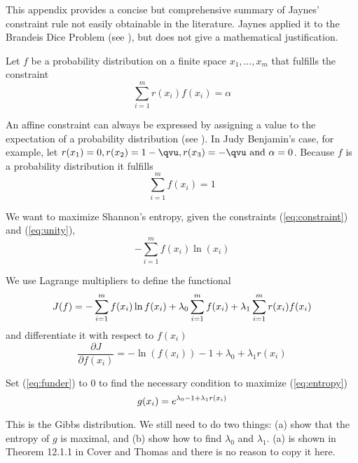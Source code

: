 This appendix provides a concise but comprehensive summary of
Jaynes' constraint rule not easily obtainable in the literature.
Jaynes applied it to the Brandeis Dice Problem (see
), but does not give a mathematical
justification.

Let $f$ be a probability distribution on a finite space
$x_{1},\ldots,x_{m}$ that fulfills the constraint 
\begin{equation}
  \label{eq:constraint}
\sum_{i=1}^{m}r(x_{i})f(x_{i})=\alpha
\end{equation}

An affine constraint can always be expressed by assigning a value to
the expectation of a probability distribution (see
). In Judy Benjamin's case, for example, let
$r(x_{1})=0, r(x_{2})=1-{\qvu}, r(x_{3})=-{\qvu}\mbox{ and }\alpha=0$. Because $f$
is a probability distribution it fulfills
\begin{equation}
  \label{eq:unity}
\sum_{i=1}^{m}f(x_{i})=1
\end{equation}

We want to maximize Shannon's entropy, given the constraints
({\ref{eq:constraint}}) and ({\ref{eq:unity}}),
\begin{equation}
  \label{eq:entropy}
-\sum_{i=1}^{m}f(x_{i})\ln(x_{i})
\end{equation}

We use Lagrange multipliers to define the functional
\begin{equation}
  \label{eq:functional}
J(f)=-\sum_{i=1}^{m}f(x_{i})\ln{}f(x_{i})+\lambda_{0}\sum_{i=1}^{m}f(x_{i})+\lambda_{1}\sum_{i=1}^{m}r(x_{i})f(x_{i})\notag
\end{equation}
and differentiate it with respect to $f(x_{i})$
\begin{equation}
  \label{eq:funder}
\frac{\partial{}J}{\partial{}f(x_{i})}=-\ln(f(x_{i}))-1+\lambda_{0}+\lambda_{1}r(x_{i})
\end{equation}

Set ({\ref{eq:funder}}) to $0$ to find the necessary condition to
maximize ({\ref{eq:entropy}})
\begin{equation}
  \label{eq:coverthomas}
g(x_{i})=e^{\lambda_{0}-1+\lambda_{1}r(x_{i})}\notag
\end{equation}

This is the Gibbs distribution. We still need to do two things: (a)
show that the entropy of $g$ is maximal, and (b) show how to find
$\lambda_{0}$ and $\lambda_{1}$. (a) is shown in Theorem 12.1.1 in
Cover and Thomas  and there is no reason to
copy it here. 

